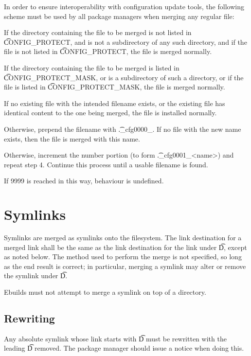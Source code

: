 In order to ensure interoperability with configuration update tools, the following scheme must be
used by all package managers when merging any regular file:

\begin{compactenum}
\item If the directory containing the file to be merged is not listed in \t{CONFIG\_PROTECT}, and
     is not a subdirectory of any such directory, and if the file is not listed in \t{CONFIG\_PROTECT},
     the file is merged normally.
\item If the directory containing the file to be merged is listed in \t{CONFIG\_PROTECT\_MASK}, or
    is a subdirectory of such a directory, or if the file is listed in \t{CONFIG\_PROTECT\_MASK},
    the file is merged normally.
\item If no existing file with the intended filename exists, or the existing file has identical
    content to the one being merged, the file is installed normally.
\item Otherwise, prepend the filename with \t{.\_cfg0000\_}. If no file with the new name exists,
    then the file is merged with this name.
\item Otherwise, increment the number portion (to form \t{.\_cfg0001\_<name>}) and repeat step 4.
    Continue this process until a usable filename is found.
\item If 9999 is reached in this way, behaviour is undefined.
\end{compactenum}

\section{Symlinks}

Symlinks are merged as symlinks onto the filesystem. The link destination for a merged link shall be
the same as the link destination for the link under \t{D}, except as noted below. The method used to
perform the merge is not specified, so long as the end result is correct; in particular, merging a
symlink may alter or remove the symlink under \t{D}.

Ebuilds must not attempt to merge a symlink on top of a directory.

\subsection{Rewriting}

Any absolute symlink whose link starts with \t{D} must be rewritten with the leading \t{D} removed.
The package manager should issue a notice when doing this.

